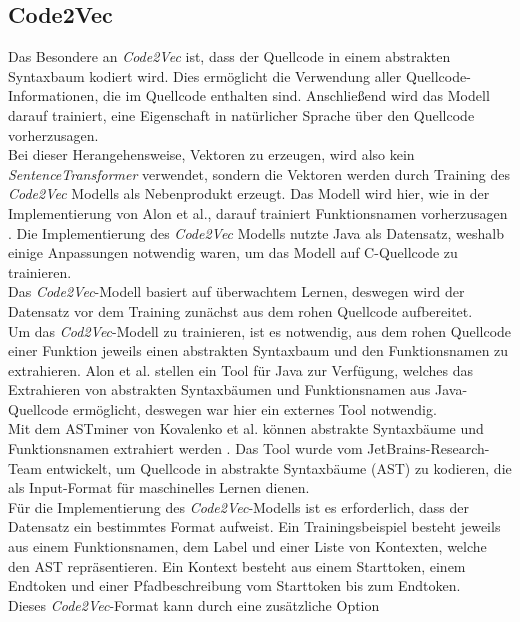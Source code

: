 \documentclass[12pt,letterpaper,ngerman]{article}
\begin{document}
\subsection{Code2Vec}
Das Besondere an \textit{Code2Vec} ist, dass der Quellcode in einem
abstrakten Syntaxbaum kodiert wird. Dies ermöglicht die Verwendung aller
Quellcode-Informationen, die im Quellcode enthalten sind. Anschließend wird
das Modell darauf trainiert, eine Eigenschaft in natürlicher Sprache
über den Quellcode vorherzusagen.\\
Bei dieser Herangehensweise, Vektoren zu erzeugen, wird
also kein \textit{SentenceTransformer}
verwendet, sondern die Vektoren werden durch Training des
\textit{Code2Vec} Modells als Nebenprodukt erzeugt. 
Das Modell wird hier, wie in der Implementierung von 
Alon et al., darauf trainiert Funktionsnamen vorherzusagen
\cite{code2vec}.
Die Implementierung des \textit{Code2Vec} Modells
nutzte Java als Datensatz, weshalb einige Anpassungen notwendig waren,
um das Modell auf C-Quellcode zu trainieren.\\
Das \textit{Code2Vec}-Modell basiert auf überwachtem Lernen,
deswegen wird der Datensatz vor dem Training zunächst aus
dem rohen Quellcode aufbereitet.\\
Um das \textit{Cod2Vec}-Modell zu trainieren,
ist es notwendig,
aus dem rohen Quellcode einer Funktion jeweils einen abstrakten 
Syntaxbaum und den
Funktionsnamen zu extrahieren. Alon et al. stellen ein Tool 
für Java zur Verfügung, welches das Extrahieren von abstrakten 
Syntaxbäumen und Funktionsnamen aus Java-Quellcode ermöglicht, 
deswegen war hier ein externes Tool notwendig.\\
Mit dem ASTminer von Kovalenko et al. können abstrakte Syntaxbäume
und Funktionsnamen extrahiert werden \cite{kovalenko2019pathminer}. 
Das Tool wurde vom JetBrains-Research-Team entwickelt, um Quellcode
in abstrakte Syntaxbäume (AST) zu 
kodieren, die als Input-Format für maschinelles Lernen dienen.\\ 
Für die Implementierung des \textit{Code2Vec}-Modells ist es 
erforderlich, dass der Datensatz ein bestimmtes Format aufweist.
Ein Trainingsbeispiel besteht jeweils aus einem 
Funktionsnamen, dem Label und einer Liste von Kontexten, welche den AST 
repräsentieren. Ein Kontext besteht aus einem Starttoken, einem Endtoken 
und einer Pfadbeschreibung vom Starttoken bis zum Endtoken.\\
Dieses \textit{Code2Vec}-Format kann durch eine zusätzliche Option
\end{document}
